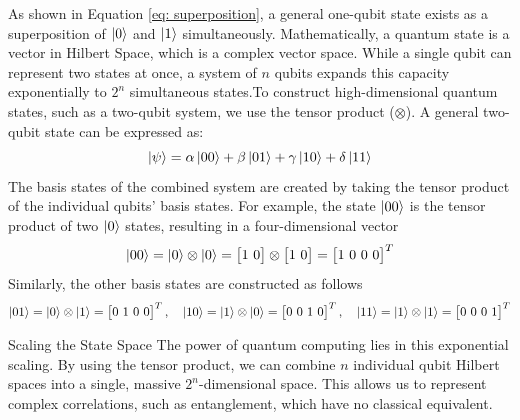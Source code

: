 \documentclass[11pt, letterpaper]{article}
\begin{document}
As shown in Equation \ref{eq: superposition}, a general one-qubit state exists as a superposition of $\ket{0}$ and $\ket{1}$ simultaneously. Mathematically, a quantum state is a vector in Hilbert Space, which is a complex vector space. While a single qubit can represent two states at once, a system of $n$ qubits expands this capacity exponentially to $2^n$ simultaneous states.To construct high-dimensional quantum states, such as a two-qubit system, we use the tensor product ($\otimes$). A general two-qubit state can be expressed as:\begin{equation}\ket{\psi} = \alpha \ket{00} + \beta \ket{01} + \gamma \ket{10} + \delta \ket{11}\label{eq: two_qubit_state}\end{equation}The basis states of the combined system are created by taking the tensor product of the individual qubits' basis states. For example, the state $\ket{00}$ is the tensor product of two $\ket{0}$ states, resulting in a four-dimensional vector
\begin{equation}
  \ket{00} = \ket{0} \otimes \ket{0} = \begin{bmatrix} 1 \ 0 \end{bmatrix} \otimes \begin{bmatrix} 1 \ 0 \end{bmatrix} = \begin{bmatrix} 1 \ 0 \ 0 \ 0 \end{bmatrix}^T\label{eq: tensor_example}
\end{equation}
Similarly, the other basis states are constructed as follows
\begin{equation}
  \begin{aligned}
    \ket{01} = \ket{0} \otimes \ket{1} = \begin{bmatrix} 0 \ 1 \ 0 \ 0 \end{bmatrix}^T, \quad\ket{10} = \ket{1} \otimes \ket{0} = \begin{bmatrix} 0 \ 0 \ 1 \ 0 \end{bmatrix}^T, \quad\ket{11} = \ket{1} \otimes \ket{1} = \begin{bmatrix} 0 \ 0 \ 0 \ 1 \end{bmatrix}^T
  \end{aligned}
  \label{eq: tensor_product_all}
\end{equation}

\begin{SBUBox}{Scaling the State Space}
  The power of quantum computing lies in this exponential scaling. By using the tensor product, we can combine $n$ individual qubit Hilbert spaces into a single, massive $2^n$-dimensional space. This allows us to represent complex correlations, such as entanglement, which have no classical equivalent.
\end{SBUBox}
\end{document}
